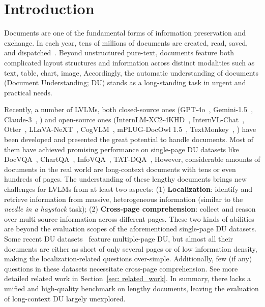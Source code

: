 \section{Introduction}

Documents are one of the fundamental forms of information preservation and exchange. In each year, tens of millions of documents are created, read, saved, and dispatched~\cite{Bornmann2014GrowthRO}. Beyond unstructured pure-text, documents feature both complicated layout structures and information across distinct modalities such as text, table, chart, image, \etc Accordingly, the automatic understanding of documents (Document Understanding; DU) stands as a long-standing task in urgent and practical needs.

Recently, a number of LVLMs, both closed-source ones (GPT-4o~\cite{gpt4o}, Gemini-1.5~\cite{geminiteam2024gemini}, Claude-3~\cite{claude3}, \etc) and open-source ones (InternLM-XC2-4KHD~\cite{dong2024internlm}, InternVL-Chat~\cite{chen2024far}, Otter~\cite{li2023otter}, LLaVA-NeXT~\cite{li2024llavanext-strong}, CogVLM~\cite{wang2023cogvlm}, mPLUG-DocOwl 1.5~\cite{hu2024mplugdocowl}, TextMonkey~\cite{liu2024textmonkey}, \etc) have been developed and presented the great potential to handle documents. Most of them have achieved promising performance on single-page DU datasets like DocVQA~\cite{Mathew2020DocVQAAD}, ChartQA~\cite{masry-etal-2022-chartqa}, InfoVQA~\cite{Mathew2021InfographicVQA}, TAT-DQA~\cite{zhu2022towards}, \etc However, considerable amounts of documents in the real world are long-context documents with tens or even hundreds of pages. The understanding of these lengthy documents brings new challenges for LVLMs from at least two aspects: (1) \textbf{Localization}: identify and retrieve information from massive, heterogeneous information (similar to the \textit{needle in a haystack} task); (2) \textbf{Cross-page comprehension}: collect and reason over multi-source information across different pages. These two kinds of abilities are beyond the evaluation scopes of the aforementioned single-page DU datasets. Some recent DU datasets~\cite{tito2023hierarchical, VanLandeghem2023DocumentUD, SlideVQA2023} feature multiple-page DU, but almost all their documents are either as short of only several pages or of low information density, making the localization-related questions over-simple. Additionally, few (if any) questions in these datasets necessitate cross-page comprehension. See more detailed related work in Section~\ref{sec: related_work}. In summary, there lacks a unified and high-quality benchmark on lengthy documents, leaving the evaluation of long-context DU largely unexplored.


